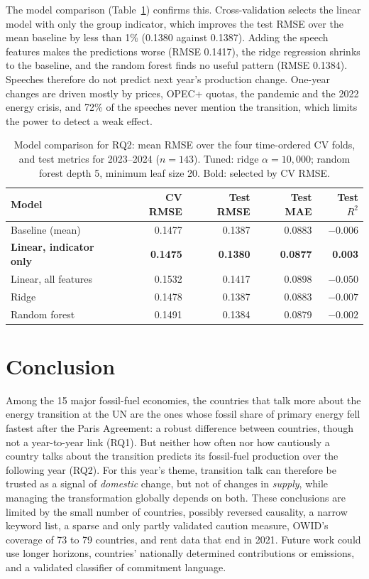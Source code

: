 \documentclass{llncs}
\begin{document}
The model comparison (Table~\ref{tab:rq2models}) confirms this. Cross-validation selects the linear model with only the group indicator, which improves the test RMSE over the mean baseline by less than 1\% (0.1380 against 0.1387). Adding the speech features makes the predictions worse (RMSE 0.1417), the ridge regression shrinks to the baseline, and the random forest finds no useful pattern (RMSE 0.1384). Speeches therefore do not predict next year's production change. One-year changes are driven mostly by prices, OPEC+ quotas, the pandemic and the 2022 energy crisis, and 72\% of the speeches never mention the transition, which limits the power to detect a weak effect.

\begin{table}[htbp]
    \centering
    \caption{Model comparison for RQ2: mean RMSE over the four time-ordered CV folds, and test metrics for 2023--2024 ($n = 143$). Tuned: ridge $\alpha = 10{,}000$; random forest depth 5, minimum leaf size 20. Bold: selected by CV RMSE.}
    \label{tab:rq2models}
    \begin{tabular}{lrrrr}
        \toprule
        Model & CV RMSE & Test RMSE & Test MAE & Test $R^2$ \\
        \midrule
        Baseline (mean) & 0.1477 & 0.1387 & 0.0883 & $-0.006$ \\
        \textbf{Linear, indicator only} & \textbf{0.1475} & \textbf{0.1380} & \textbf{0.0877} & \textbf{0.003} \\
        Linear, all features & 0.1532 & 0.1417 & 0.0898 & $-0.050$ \\
        Ridge & 0.1478 & 0.1387 & 0.0883 & $-0.007$ \\
        Random forest & 0.1491 & 0.1384 & 0.0879 & $-0.002$ \\
        \bottomrule
    \end{tabular}
\end{table}

\section{Conclusion}\label{sec:conclusion}
Among the 15 major fossil-fuel economies, the countries that talk more about the energy transition at the UN are the ones whose fossil share of primary energy fell fastest after the Paris Agreement: a robust difference between countries, though not a year-to-year link (RQ1). But neither how often nor how cautiously a country talks about the transition predicts its fossil-fuel production over the following year (RQ2). For this year's theme, transition talk can therefore be trusted as a signal of \emph{domestic} change, but not of changes in \emph{supply}, while managing the transformation globally depends on both. These conclusions are limited by the small number of countries, possibly reversed causality, a narrow keyword list, a sparse and only partly validated caution measure, OWID's coverage of 73 to 79 countries, and rent data that end in 2021. Future work could use longer horizons, countries' nationally determined contributions or emissions, and a validated classifier of commitment language.



\end{document}
